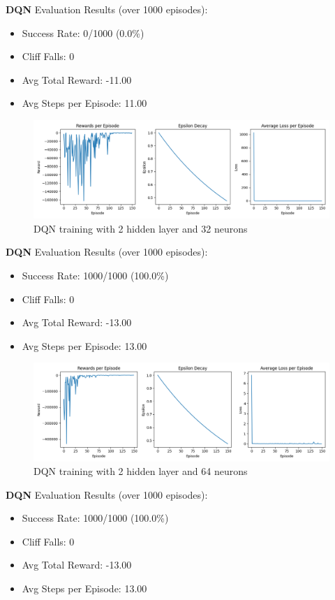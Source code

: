 \documentclass[a4paper,12pt]{article}
\begin{document}
\textbf{DQN} Evaluation Results (over 1000 episodes):
\begin{itemize}
    \item Success Rate: 0/1000 (0.0\%)
    \item Cliff Falls: 0
    \item Avg Total Reward: -11.00
    \item Avg Steps per Episode: 11.00
\end{itemize}
\begin{figure}[H]
    \centering
    \includegraphics[width=\linewidth]{2_32.png}
    \caption{DQN training with 2 hidden layer and 32 neurons}
\end{figure}
\textbf{DQN} Evaluation Results (over 1000 episodes):
\begin{itemize}
    \item Success Rate: 1000/1000 (100.0\%)
    \item Cliff Falls: 0
    \item Avg Total Reward: -13.00
    \item Avg Steps per Episode: 13.00
\end{itemize}
\begin{figure}[H]
    \centering
    \includegraphics[width=\linewidth]{2_64.png}
    \caption{DQN training with 2 hidden layer and 64 neurons}
\end{figure}
\textbf{DQN} Evaluation Results (over 1000 episodes):
\begin{itemize}
    \item Success Rate: 1000/1000 (100.0\%)
    \item Cliff Falls: 0
    \item Avg Total Reward: -13.00
    \item Avg Steps per Episode: 13.00
\end{itemize}
\end{document}
